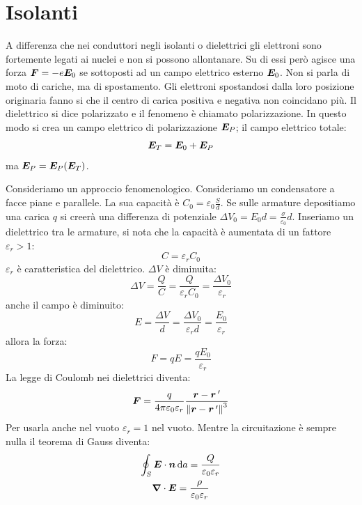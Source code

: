 \section{Isolanti}
A differenza che nei conduttori negli isolanti o dielettrici gli elettroni sono fortemente legati ai nuclei e non si possono allontanare. Su di essi però agisce una forza $\boldsymbol{F}=-e\boldsymbol{E}_0$ se sottoposti ad un campo elettrico esterno $\boldsymbol{E}_0$. Non si parla di moto di cariche, ma di spostamento. Gli elettroni spostandosi dalla loro posizione originaria fanno si che il centro di carica positiva e negativa non coincidano più. Il dielettrico si dice polarizzato e il fenomeno è chiamato polarizzazione. In questo modo si crea un campo elettrico di polarizzazione $\boldsymbol{E}_P$; il campo elettrico totale:
\begin{equation}
\boldsymbol{E}_T=\boldsymbol{E}_0+\boldsymbol{E}_P
\end{equation}
ma $\boldsymbol{E}_P=\boldsymbol{E}_P(\boldsymbol{E}_T)$.

Consideriamo un approccio fenomenologico. Consideriamo un condensatore a facce piane e parallele. La sua capacità è $C_0=\varepsilon_0\frac{S}{d}$. Se sulle armature depositiamo una carica $q$ si creerà una differenza di potenziale $\Delta V_0=E_0d=\frac{\sigma}{\varepsilon_0}d$. Inseriamo un dielettrico tra le armature, si nota che la capacità è aumentata di un fattore $\varepsilon_r>1$:
\begin{equation*}C=\varepsilon_rC_0\end{equation*}
$\varepsilon_r$ è caratteristica del dielettrico. $\Delta V$ è diminuita:
\begin{equation*}\Delta V=\frac{Q}{C}=\frac{Q}{\varepsilon_r C_0}=\frac{\Delta V_0}{\varepsilon_r}\end{equation*}
anche il campo è diminuito:
\begin{equation*}E=\frac{\Delta V}{d}=\frac{\Delta V_0}{\varepsilon_rd}=\frac{E_0}{\varepsilon_r}\end{equation*}
allora la forza:
\begin{equation*}F=qE=\frac{qE_0}{\varepsilon_r}\end{equation*}
La legge di Coulomb nei dielettrici diventa:
\begin{equation}
\boldsymbol{F}=\frac{q}{4\pi\varepsilon_0\varepsilon_r}\frac{\boldsymbol{r}-\boldsymbol{r}\,'}{{\left\lVert\boldsymbol{r}-\boldsymbol{r}\,'\right\rVert}^3}
\end{equation}
Per usarla anche nel vuoto $\varepsilon_r=1$ nel vuoto. Mentre la circuitazione è sempre nulla il teorema di Gauss diventa:
\begin{subequations}
\begin{gather}
\oint_S\boldsymbol{E}\cdot\boldsymbol{n}\,\mathrm{d} a=\frac{Q}{\varepsilon_0\varepsilon_r}\\
\boldsymbol{\nabla}\cdot\boldsymbol{E}=\frac{\rho}{\varepsilon_0\varepsilon_r}
\end{gather}
\end{subequations}
